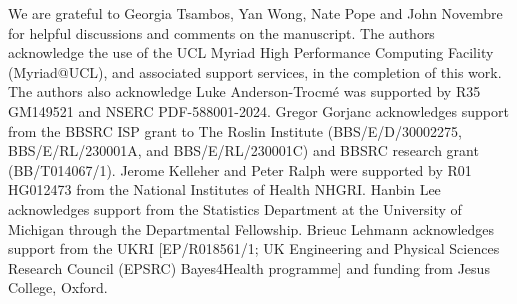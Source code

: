 
We are grateful to Georgia Tsambos, Yan Wong, Nate Pope and John Novembre
for helpful discussions and comments on the manuscript.
%
The authors acknowledge the use of the UCL Myriad High Performance Computing Facility (Myriad@UCL), and associated support services, in the completion of this work.
%
The authors also acknowledge 
Luke Anderson-Trocm\'{e} was supported by R35 GM149521 and NSERC PDF-588001-2024.
%
Gregor Gorjanc acknowledges support from the BBSRC ISP grant to The Roslin Institute
(BBS/E/D/30002275, BBS/E/RL/230001A, and BBS/E/RL/230001C) and BBSRC research grant (BB/T014067/1).
%
Jerome Kelleher and Peter Ralph were supported by R01 HG012473
from the National Institutes of Health NHGRI.
%
Hanbin Lee acknowledges support from the Statistics Department at the University of Michigan through the Departmental Fellowship.
%
Brieuc Lehmann acknowledges support from the UKRI [EP/R018561/1; UK Engineering and Physical Sciences Research Council (EPSRC) Bayes4Health programme] and funding from Jesus College, Oxford.